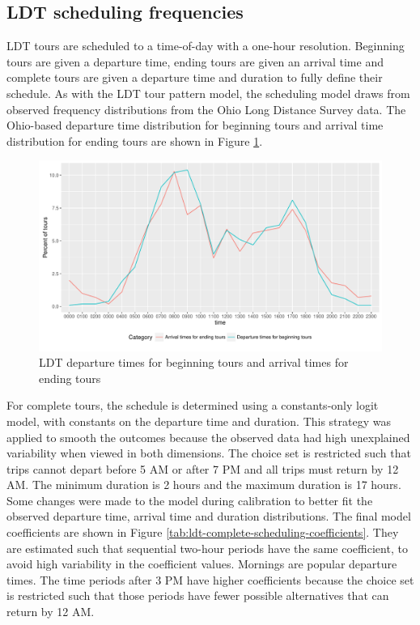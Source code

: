\subsection{LDT scheduling frequencies}
LDT tours are scheduled to a time-of-day with a one-hour resolution. Beginning tours are given a departure time, ending tours are given an arrival time and complete tours are given a departure time and duration to fully define their schedule. As with the LDT tour pattern model, the scheduling model draws from observed frequency distributions from the Ohio Long Distance Survey data. The Ohio-based departure time distribution for beginning tours and arrival time distribution for ending tours are shown in Figure \ref{fig:ldt-tours-hourly-distribution}. 

\begin{figure}  %
\centering
\includegraphics[width=6in, trim=0mm 5mm 0mm 0mm, clip]{pt/tours-hourly-distribution}  %
\caption{LDT departure times for beginning tours and arrival times for ending tours}
\label{fig:ldt-tours-hourly-distribution}
\end{figure}
 
For complete tours, the schedule is determined using a constants-only logit model, with constants on the departure time and duration. This strategy was applied to smooth the outcomes because the observed data had high unexplained variability when viewed in both dimensions. The choice set is restricted such that trips cannot depart before 5 AM or after 7 PM and all trips must return by 12 AM. The minimum duration is 2 hours and the maximum duration is 17 hours. Some changes were made to the model during calibration to better fit the observed departure time, arrival time and duration distributions. The final model coefficients are shown in Figure \ref{tab:ldt-complete-scheduling-coefficients}. They are estimated such that sequential two-hour periods have the same coefficient, to avoid high variability in the coefficient values. Mornings are popular departure times. The time periods after 3 PM have higher coefficients because the choice set is restricted such that those periods have fewer possible alternatives that can return by 12 AM.

